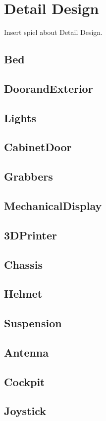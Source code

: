 

\chapter{Detail Design}

Insert spiel about Detail Design.

\newcommand{\DetailDesign}[1]{
\section{#1}

}

\DetailDesign{Bed}
\DetailDesign{DoorandExterior}
\DetailDesign{Lights}
\DetailDesign{CabinetDoor}
\DetailDesign{Grabbers}
\DetailDesign{MechanicalDisplay}
\DetailDesign{3DPrinter}
\DetailDesign{Chassis}
\DetailDesign{Helmet}
\DetailDesign{Suspension}
\DetailDesign{Antenna}
\DetailDesign{Cockpit}
\DetailDesign{Joystick}

